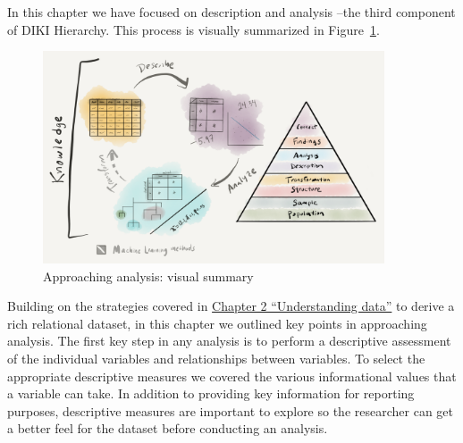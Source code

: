 \documentclass[
  letterpaper,
]{latex/krantz}
\begin{document}
In this chapter we have focused on description and analysis --the third
component of DIKI Hierarchy. This process is visually summarized in
Figure~\ref{fig-approaching-analysis-visual-summary-graphic}.

\begin{figure}

{\centering \includegraphics[width=0.9\textwidth,height=\textheight]{./figures/approaching-analysis/approaching-analysis-visual-summary-paper.png}

}

\caption{\label{fig-approaching-analysis-visual-summary-graphic}Approaching
analysis: visual summary}

\end{figure}

Building on the strategies covered in
\protect\hyperlink{sec-understanding-data}{Chapter 2 ``Understanding
data''} to derive a rich relational dataset, in this chapter we outlined
key points in approaching analysis. The first key step in any analysis
is to perform a descriptive assessment of the individual variables and
relationships between variables. To select the appropriate descriptive
measures we covered the various informational values that a variable can
take. In addition to providing key information for reporting purposes,
descriptive measures are important to explore so the researcher can get
a better feel for the dataset before conducting an analysis.
\end{document}
